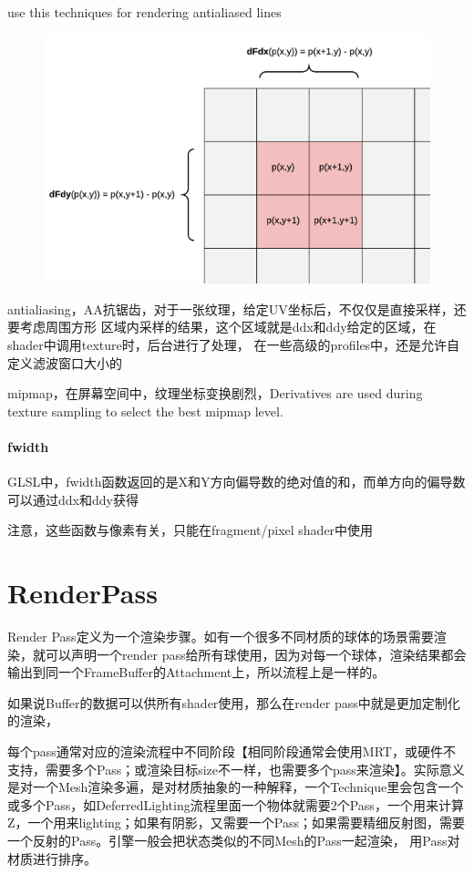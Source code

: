 use this techniques for rendering antialiased lines

\begin{figure}[h]
    \centering
    \includegraphics[width=\textwidth]{images/Shader-Derivatives.png}
\end{figure}

antialiasing，AA抗锯齿，对于一张纹理，给定UV坐标后，不仅仅是直接采样，还要考虑周围方形
区域内采样的结果，这个区域就是ddx和ddy给定的区域，在shader中调用texture时，后台进行了处理，
在一些高级的profiles中，还是允许自定义滤波窗口大小的

mipmap，在屏幕空间中，纹理坐标变换剧烈，Derivatives are used during texture sampling to
select the best mipmap level.

\paragraph{fwidth}
GLSL中，fwidth函数返回的是X和Y方向偏导数的绝对值的和，而单方向的偏导数可以通过ddx和ddy获得

注意，这些函数与像素有关，只能在fragment/pixel shader中使用


\section{RenderPass}

Render Pass定义为一个渲染步骤。如有一个很多不同材质的球体的场景需要渲染，就可以声明一个render pass给所有球使用，因为对每一个球体，渲染结果都会输出到同一个FrameBuffer的Attachment上，所以流程上是一样的。

如果说Buffer的数据可以供所有shader使用，那么在render pass中就是更加定制化的渲染，

每个pass通常对应的渲染流程中不同阶段【相同阶段通常会使用MRT，或硬件不支持，需要多个Pass；或渲染目标size不一样，也需要多个pass来渲染】。实际意义是对一个Mesh渲染多遍，是对材质抽象的一种解释，一个Technique里会包含一个或多个Pass，如DeferredLighting流程里面一个物体就需要2个Pass，一个用来计算Z，一个用来lighting；如果有阴影，又需要一个Pass；如果需要精细反射图，需要一个反射的Pass。引擎一般会把状态类似的不同Mesh的Pass一起渲染， 用Pass对材质进行排序。


